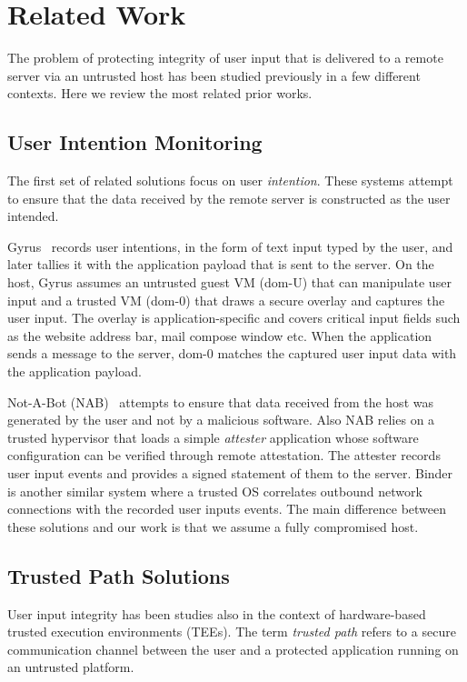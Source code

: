 \section{Related Work}
\label{sec:relatedWork}

The problem of protecting integrity of user input that is delivered to a remote server via an untrusted host has been studied previously in a few different contexts. Here we review the most related prior works.

\subsection{User Intention Monitoring} 

The first set of related solutions focus on user \emph{intention}. These systems attempt to ensure that the data received by the remote server is constructed as the user intended. 

Gyrus~\cite{gyrus} records user intentions, in the form of text input typed by the user, and later tallies it with the application payload that is sent to the server. On the host, Gyrus assumes an untrusted guest VM (dom-U) that can manipulate user input and a trusted VM (dom-0) that draws a secure overlay and captures the user input. The overlay is application-specific and covers critical input fields such as the website address bar, mail compose window etc. When the application sends a message to the server, dom-0 matches the captured user input data with the application payload. 

Not-A-Bot (NAB)~\cite{nab} attempts to ensure that data received from the host was generated by the user and not by a malicious software. Also NAB relies on a trusted hypervisor that loads a simple \emph{attester} application whose software configuration can be verified through remote attestation. The attester records user input events and provides a signed statement of them to the server. Binder~\cite{binder} is another similar system where a trusted OS correlates outbound network connections with the recorded user inputs events. The main difference between these solutions and our work is that we assume a fully compromised host.


\subsection{Trusted Path Solutions} 

User input integrity has been studies also in the context of hardware-based trusted execution environments (TEEs). The term \emph{trusted path} refers to a secure communication channel between the user and a protected application running on an untrusted platform. 

